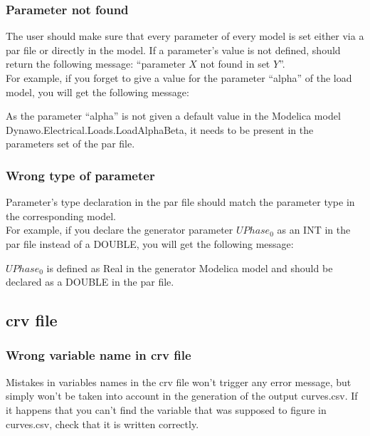 \documentclass[a4paper, 12pt]{report}
\begin{document}
\subsubsection{Parameter not found}

The user should make sure that every parameter of every model is set either via a par file or directly in the model. If a parameter's value is not defined, \Dynawo should return the following message: ``parameter $X$ not found in set $Y$''. \\

For example, if you forget to give a value for the parameter ``alpha'' of the load model, you will get the following message:


As the parameter ``alpha'' is not given a default value in the Modelica model Dynawo.Electrical.Loads.LoadAlphaBeta, it needs to be present in the parameters set of the par file.

\subsubsection{Wrong type of parameter}

Parameter's type declaration in the par file should match the parameter type in the corresponding model. \\

For example, if you declare the generator parameter $UPhase_0$ as an INT in the par file instead of a DOUBLE, you will get the following message:
\vspace{0.6cm} %


$UPhase_0$ is defined as Real in the generator Modelica model and should be declared as a DOUBLE in the par file.

\subsection{crv file}

\subsubsection{Wrong variable name in crv file}

Mistakes in variables names in the crv file won't trigger any error message, but simply won't be taken into account in the generation of the output curves.csv. If it happens that you can't find the variable that was supposed to figure in curves.csv, check that it is written correctly.
\end{document}
